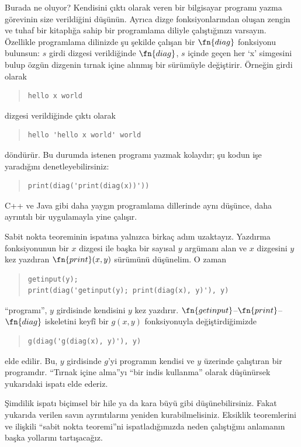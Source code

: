 \documentclass[../../../include/open-logic-section]{subfiles}
\begin{document}
\begin{explain}
Burada ne oluyor? Kendisini çıktı olarak veren bir bilgisayar programı yazma
görevinin size verildiğini düşünün. Ayrıca dizge fonksiyonlarından oluşan
zengin ve tuhaf bir kitaplığa sahip bir programlama diliyle çalıştığınızı
varsayın. Özellikle programlama dilinizde şu şekilde çalışan bir
$\fn{diag}$ fonksiyonu bulunsun: $s$ girdi dizgesi verildiğinde $\fn{diag}$,
$s$ içinde geçen her `x' simgesini bulup özgün dizgenin tırnak içine alınmış
bir sürümüyle değiştirir. Örneğin girdi olarak
\begin{quote}
\begin{verbatim}
hello x world
\end{verbatim}
\end{quote}
dizgesi verildiğinde çıktı olarak
\begin{quote}
\begin{verbatim}
hello 'hello x world' world
\end{verbatim}
\end{quote}
döndürür. Bu durumda istenen programı yazmak kolaydır; şu kodun işe
yaradığını denetleyebilirsiniz:
\begin{quote}
\begin{verbatim}
print(diag('print(diag(x))'))
\end{verbatim}
\end{quote}
C++ ve Java gibi daha yaygın programlama dillerinde aynı düşünce, daha
ayrıntılı bir uygulamayla yine çalışır.

Sabit nokta teoreminin ispatına yalnızca birkaç adım uzaktayız. Yazdırma
fonksiyonunun bir $x$ dizgesi ile başka bir sayısal $y$ argümanı alan ve
$x$ dizgesini $y$ kez yazdıran $\fn{print}(x,y)$ sürümünü düşünelim. O zaman
\begin{quote}
\begin{verbatim}
getinput(y);
print(diag('getinput(y); print(diag(x), y)'), y)
\end{verbatim}
\end{quote}
``programı'', $y$ girdisinde kendisini $y$ kez yazdırır.
$\fn{getinput}$--$\fn{print}$--$\fn{diag}$ iskeletini keyfî bir $g(x,y)$
fonksiyonuyla değiştirdiğimizde
\begin{quote}
\begin{verbatim}
g(diag('g(diag(x), y)'), y)
\end{verbatim}
\end{quote}
elde edilir. Bu, $y$ girdisinde $g$'yi programın kendisi ve $y$ üzerinde
çalıştıran bir programdır. ``Tırnak içine alma''yı ``bir indis kullanma''
olarak düşünürsek yukarıdaki ispatı elde ederiz.

Şimdilik ispatı biçimsel bir hile ya da kara büyü gibi düşünebilirsiniz.
Fakat yukarıda verilen savın ayrıntılarını yeniden kurabilmelisiniz.
Eksiklik teoremlerini ve ilişkili ``sabit nokta teoremi''ni ispatladığımızda
neden çalıştığını anlamanın başka yollarını tartışacağız.
\end{explain}
\end{document}
